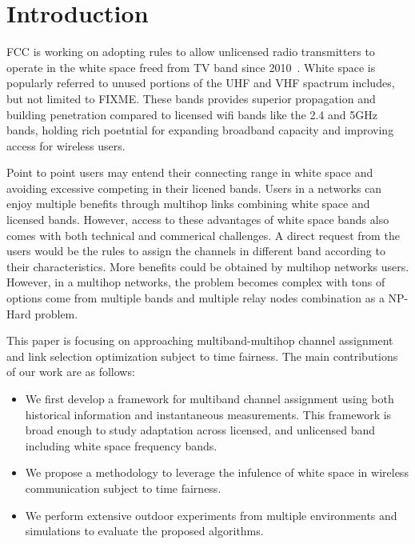 
\section{Introduction}
\label{sec:introduction}

FCC is working on adopting rules to allow unlicensed radio transmitters to operate in the white space freed from TV band since 2010~\cite{fccwhitespace}. White space is popularly referred to unused portions of the UHF and VHF spactrum includes, but not limited to {FIXME}. These bands provides superior propagation and building penetration compared to licensed wifi bands like the 2.4 and 5GHz bands, holding rich poetntial for expanding broadband capacity and improving access for wireless users. 



Point to point users may entend their connecting range in white space and avoiding excessive competing in their licened bands.
Users in a networks can enjoy multiple benefits through multihop links combining white space and licensed bands. However, access to these advantages of white space bands also comes with both technical and commerical challenges. A direct request from the users would be the rules to assign the channels in different band according to their characteristics. 
More benefits could be obtained by multihop networks users. However, in a multihop networks, the problem becomes complex with tons of options come from multiple bands and multiple relay nodes combination as a NP-Hard problem.


% 

This paper is focusing on approaching multiband-multihop channel assignment and link selection optimization subject to time fairness.
% 
The main contributions of our work are as follows:
\begin{itemize}
\item We first develop a framework for multiband channel assignment using both historical information and instantaneous measurements. This framework is broad enough to study adaptation across licensed, and unlicensed band including white space frequency bands.  

\item We propose a methodology to leverage the infulence of white space in wireless communication subject to time fairness.

\item We perform extensive outdoor experiments from multiple environments and simulations to evaluate the proposed algorithms.


\end{itemize}




